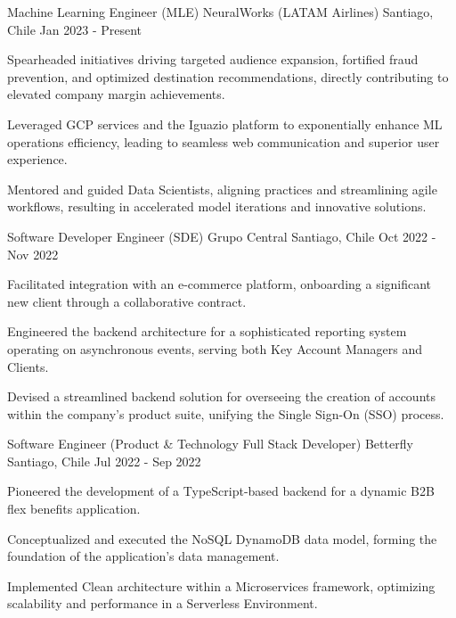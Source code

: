   \cventry
  {Machine Learning Engineer (MLE)}
  {NeuralWorks (LATAM Airlines)}
  {Santiago, Chile}
  {Jan 2023 - Present}
  {
  \begin{cvitems} %
    \item Spearheaded initiatives driving targeted audience expansion, fortified fraud prevention, and optimized destination recommendations, directly contributing to elevated company margin achievements.
    \item Leveraged GCP services and the Iguazio platform to exponentially enhance ML operations efficiency, leading to seamless web communication and superior user experience.
    \item Mentored and guided Data Scientists, aligning practices and streamlining agile workflows, resulting in accelerated model iterations and innovative solutions.
  \end{cvitems}
  }

  \cventry
  {Software Developer Engineer (SDE)}
  {Grupo Central}
  {Santiago, Chile}
  {Oct 2022 - Nov 2022}
  {
  \begin{cvitems}
    \item Facilitated integration with an e-commerce platform, onboarding a significant new client through a collaborative contract.
    \item Engineered the backend architecture for a sophisticated reporting system operating on asynchronous events, serving both Key Account Managers and Clients.
    \item Devised a streamlined backend solution for overseeing the creation of accounts within the company's product suite, unifying the Single Sign-On (SSO) process.
  \end{cvitems}
  }

  \cventry
  {Software Engineer (Product \& Technology Full Stack Developer)}
  {Betterfly}
  {Santiago, Chile}
  {Jul 2022 - Sep 2022}
  {
  \begin{cvitems} %
    \item Pioneered the development of a TypeScript-based backend for a dynamic B2B flex benefits application.
    \item Conceptualized and executed the NoSQL DynamoDB data model, forming the foundation of the application's data management.
    \item Implemented Clean architecture within a Microservices framework, optimizing scalability and performance in a Serverless Environment.
  \end{cvitems}
  }

